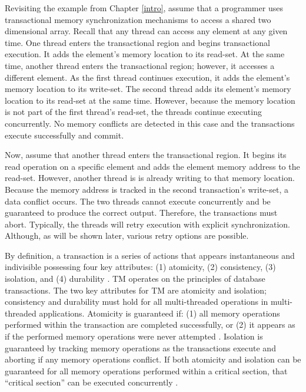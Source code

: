 \documentclass[11pt]{book}
\begin{document}
Revisiting the example from Chapter \ref{intro}, assume that a programmer uses
transactional memory synchronization mechanisms to access a shared two dimensional array.
Recall that any thread can access any element at any given time.  One thread enters the
transactional region and begins transactional execution.  It adds the element's memory
location to its read-set.  At the same time, another thread enters the transactional
region; however, it accesses a different element.  As the first thread continues
execution, it adds the element's memory location to its write-set.  The second thread adds
its element's memory location to its read-set at the same time.  However, because the
memory location is not part of the first thread's read-set, the threads continue executing
concurrently.  No memory conflicts are detected in this case and the transactions execute
successfully and commit.

Now, assume that another thread enters the transactional region.  It begins its read
operation on a specific element and adds the element memory address to the read-set.
However, another thread is is already writing to that memory location.  Because the memory
address is tracked in the second transaction's write-set, a data conflict occurs.  The two
threads cannot execute concurrently and be guaranteed to produce the correct output.
Therefore, the transactions must abort.  Typically, the threads will retry execution with
explicit synchronization.  Although, as will be shown later, various retry options are
possible. 

By definition, a transaction is a series of actions that appears instantaneous and
indivisible possessing four key attributes: (1) atomicity, (2) consistency, (3) isolation,
and (4) durability \cite{tm_2nd}.  TM operates on the principles of database transactions.
The two key attributes for TM are atomicity and isolation; consistency and durability must
hold for all multi-threaded operations in multi-threaded applications.  Atomicity is
guaranteed if: (1) all memory operations performed within the transaction are completed
successfully, or (2) it appears as if the performed memory operations were never attempted
\cite{tm_2nd}.  Isolation is guaranteed by tracking memory operations as the transactions
execute and aborting if any memory operations conflict.  If both atomicity and isolation
can be guaranteed for all memory operations performed within a critical section, that
``critical section'' can be executed concurrently \cite{sle_rajwar}.
\end{document}
